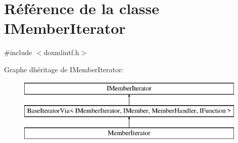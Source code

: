 \hypertarget{class_i_member_iterator}{}\section{Référence de la classe I\+Member\+Iterator}
\label{class_i_member_iterator}


{\ttfamily \#include $<$doxmlintf.\+h$>$}

Graphe d\textquotesingle{}héritage de I\+Member\+Iterator\+:\begin{figure}[H]
\begin{center}
\leavevmode
\includegraphics[height=3.000000cm]{class_i_member_iterator}
\end{center}
\end{figure}
